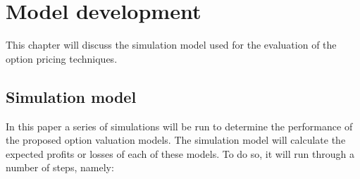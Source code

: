 \chapter{Model development}
\label{chap:ModelDevelopment}
This chapter will discuss the simulation model used for the evaluation of the option pricing techniques.  

\section{Simulation model}
\label{sec:SimulationModel}
In this paper a series of simulations will be run to determine the performance of the proposed option valuation models. The simulation model will calculate the expected profits or losses of each of these models. To do so, it will run through a number of steps, namely:

